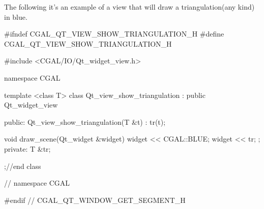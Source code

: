 \ccExample
The following it's an example of a view that will draw a triangulation(any 
kind) in blue.
\begin{ccExampleCode}
#ifndef CGAL_QT_VIEW_SHOW_TRIANGULATION_H
#define CGAL_QT_VIEW_SHOW_TRIANGULATION_H

#include <CGAL/IO/Qt_widget_view.h>

namespace CGAL {

template <class T>
class Qt_view_show_triangulation : public Qt_widget_view
{
public:
  Qt_view_show_triangulation(T &t) : tr(t){};

  void draw_scene(Qt_widget &widget)
  {
    widget << CGAL::BLUE; 
    widget << tr;
  };
private:
  T &tr;
};//end class 

} // namespace CGAL

#endif // CGAL_QT_WINDOW_GET_SEGMENT_H
\end{ccExampleCode}










